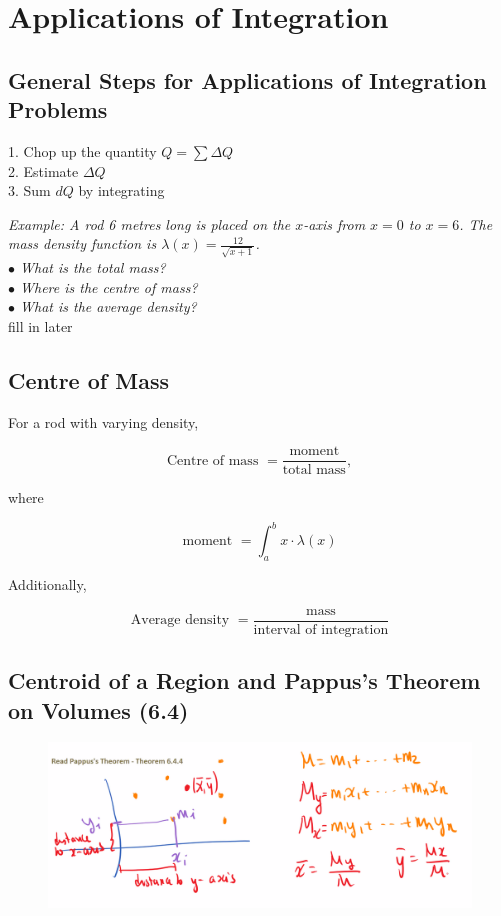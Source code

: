 \section{Applications of Integration}

    \subsection{General Steps for Applications of Integration Problems}

    1. Chop up the quantity $Q = \sum \Delta Q$ \\
    2. Estimate $\Delta Q$ \\
    3. Sum $dQ$ by integrating

    \color{blue} \textit{Example: A rod 6 metres long is placed on the $x$-axis from $x=0$ to $x=6$. The mass density function is $\lambda (x) = \frac{12}{\sqrt{x+1}}$. \\
    $\bullet$ What is the total mass? \\
    $\bullet$ Where is the centre of mass? \\
    $\bullet$ What is the average density?}
    \color{black} \\

    fill in later

    \subsection{Centre of Mass}

    For a rod with varying density,

    \[
        \text{Centre of mass } = \frac{\text{moment}}{\text{total mass}},
    \]

    where

    \[
        \text{moment } = \int_a^b x\cdot \lambda (x)
    \]

    Additionally,

    \[
        \text{Average density } = \frac{\text{mass}}{\text{interval of integration}}
    \]



\subsection{Centroid of a Region and Pappus's Theorem on Volumes (6.4)}

        \begin{figure}[hbt!]
            \centering
            \includegraphics[scale=0.5]{pappus}
        \end{figure}

